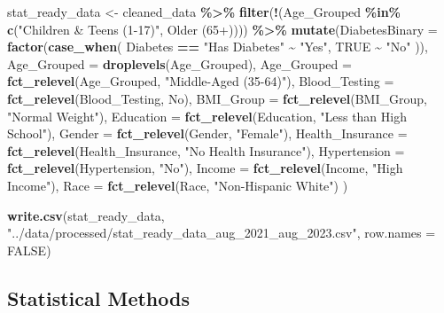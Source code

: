 \documentclass[
]{article}
\newenvironment{Shaded}{\begin{snugshade}}{\end{snugshade}}
\newcommand{\AttributeTok}[1]{\textcolor[rgb]{0.13,0.29,0.53}{#1}}
\newcommand{\ConstantTok}[1]{\textcolor[rgb]{0.56,0.35,0.01}{#1}}
\newcommand{\FunctionTok}[1]{\textcolor[rgb]{0.13,0.29,0.53}{\textbf{#1}}}
\newcommand{\NormalTok}[1]{#1}
\newcommand{\OtherTok}[1]{\textcolor[rgb]{0.56,0.35,0.01}{#1}}
\newcommand{\SpecialCharTok}[1]{\textcolor[rgb]{0.81,0.36,0.00}{\textbf{#1}}}
\newcommand{\StringTok}[1]{\textcolor[rgb]{0.31,0.60,0.02}{#1}}
\begin{document}
\begin{Shaded}
\begin{Highlighting}[]
\NormalTok{stat\_ready\_data }\OtherTok{\textless{}{-}}\NormalTok{ cleaned\_data }\SpecialCharTok{\%\textgreater{}\%}
  \FunctionTok{filter}\NormalTok{(}\SpecialCharTok{!}\NormalTok{(Age\_Grouped }\SpecialCharTok{\%in\%} \FunctionTok{c}\NormalTok{(}\StringTok{"Children \& Teens (1{-}17)"}\NormalTok{, }\StringTok{\textquotesingle{}Older (65+)\textquotesingle{}}\NormalTok{))) }\SpecialCharTok{\%\textgreater{}\%} 
  \FunctionTok{mutate}\NormalTok{(}\AttributeTok{DiabetesBinary =} \FunctionTok{factor}\NormalTok{(}\FunctionTok{case\_when}\NormalTok{(}
\NormalTok{    Diabetes }\SpecialCharTok{==} \StringTok{"Has Diabetes"} \SpecialCharTok{\textasciitilde{}} \StringTok{"Yes"}\NormalTok{,}
    \ConstantTok{TRUE} \SpecialCharTok{\textasciitilde{}} \StringTok{"No"}
\NormalTok{  )),}
  \AttributeTok{Age\_Grouped =} \FunctionTok{droplevels}\NormalTok{(Age\_Grouped),}
  \AttributeTok{Age\_Grouped =} \FunctionTok{fct\_relevel}\NormalTok{(Age\_Grouped, }\StringTok{"Middle{-}Aged (35{-}64)"}\NormalTok{),}
  \AttributeTok{Blood\_Testing =} \FunctionTok{fct\_relevel}\NormalTok{(Blood\_Testing, }\StringTok{\textquotesingle{}No\textquotesingle{}}\NormalTok{),}
  \AttributeTok{BMI\_Group =} \FunctionTok{fct\_relevel}\NormalTok{(BMI\_Group, }\StringTok{"Normal Weight"}\NormalTok{),}
  \AttributeTok{Education =} \FunctionTok{fct\_relevel}\NormalTok{(Education, }\StringTok{"Less than High School"}\NormalTok{),}
  \AttributeTok{Gender =} \FunctionTok{fct\_relevel}\NormalTok{(Gender, }\StringTok{"Female"}\NormalTok{),}
  \AttributeTok{Health\_Insurance =} \FunctionTok{fct\_relevel}\NormalTok{(Health\_Insurance, }\StringTok{"No Health Insurance"}\NormalTok{),}
  \AttributeTok{Hypertension =} \FunctionTok{fct\_relevel}\NormalTok{(Hypertension, }\StringTok{"No"}\NormalTok{),}
  \AttributeTok{Income =} \FunctionTok{fct\_relevel}\NormalTok{(Income, }\StringTok{"High Income"}\NormalTok{),}
  \AttributeTok{Race =} \FunctionTok{fct\_relevel}\NormalTok{(Race, }\StringTok{"Non{-}Hispanic White"}\NormalTok{)}
\NormalTok{  )}

\FunctionTok{write.csv}\NormalTok{(stat\_ready\_data, }\StringTok{"../data/processed/stat\_ready\_data\_aug\_2021\_aug\_2023.csv"}\NormalTok{, }\AttributeTok{row.names =} \ConstantTok{FALSE}\NormalTok{)}
\end{Highlighting}
\end{Shaded}

\subsection{Statistical Methods}\label{statistical-methods}
\end{document}
